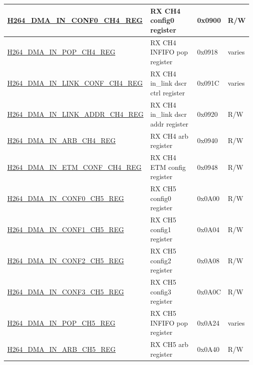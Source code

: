 \begin{longtable}{ | p{7.5cm} | p{5.7cm} | p{1.2cm} | p{1cm} | }
    \hyperref[regdesc:H264DMAINCONF0CH4REG]{H264\_DMA\_IN\_CONF0\_CH4\_REG} & RX CH4 config0 register & 0x0900 & R/W \\ \hline
    \hyperref[regdesc:H264DMAINPOPCH4REG]{H264\_DMA\_IN\_POP\_CH4\_REG} & RX CH4 INFIFO pop register & 0x0918 & varies \\ \hline
    \hyperref[regdesc:H264DMAINLINKCONFCH4REG]{H264\_DMA\_IN\_LINK\_CONF\_CH4\_REG} & RX CH4 in\_link dscr ctrl register & 0x091C & varies \\ \hline
    \hyperref[regdesc:H264DMAINLINKADDRCH4REG]{H264\_DMA\_IN\_LINK\_ADDR\_CH4\_REG} & RX CH4 in\_link dscr addr register & 0x0920 & R/W \\ \hline
    \hyperref[regdesc:H264DMAINARBCH4REG]{H264\_DMA\_IN\_ARB\_CH4\_REG} & RX CH4 arb register & 0x0940 & R/W \\ \hline
    \hyperref[regdesc:H264DMAINETMCONFCH4REG]{H264\_DMA\_IN\_ETM\_CONF\_CH4\_REG} & RX CH4 ETM config register & 0x0948 & R/W \\ \hline
    
    \hyperref[regdesc:H264DMAINCONF0CH5REG]{H264\_DMA\_IN\_CONF0\_CH5\_REG} & RX CH5 config0 register & 0x0A00 & R/W \\ \hline
    \hyperref[regdesc:H264DMAINCONF1CH5REG]{H264\_DMA\_IN\_CONF1\_CH5\_REG} & RX CH5 config1 register & 0x0A04 & R/W \\ \hline
    \hyperref[regdesc:H264DMAINCONF2CH5REG]{H264\_DMA\_IN\_CONF2\_CH5\_REG} & RX CH5 config2 register & 0x0A08 & R/W \\ \hline
    \hyperref[regdesc:H264DMAINCONF3CH5REG]{H264\_DMA\_IN\_CONF3\_CH5\_REG} & RX CH5 config3 register & 0x0A0C & R/W \\ \hline
    \hyperref[regdesc:H264DMAINPOPCH5REG]{H264\_DMA\_IN\_POP\_CH5\_REG} & RX CH5 INFIFO pop register & 0x0A24 & varies \\ \hline
    \hyperref[regdesc:H264DMAINARBCH5REG]{H264\_DMA\_IN\_ARB\_CH5\_REG} & RX CH5 arb register & 0x0A40 & R/W \\ \hline
    

\end{longtable}
